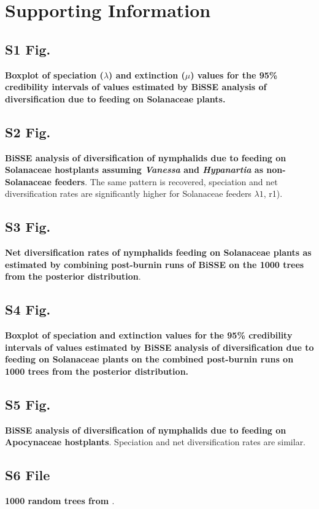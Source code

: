 \documentclass[10pt,letterpaper]{article}
\begin{document}
\section*{Supporting Information}

\subsection*{S1 Fig.}
\label{S1_Figure}
{\bf Boxplot of speciation (\(\lambda\)) and extinction
(\(\mu\)) values for the 95\% credibility intervals of values estimated
by BiSSE analysis of diversification due to feeding on Solanaceae
plants.}

\subsection*{S2 Fig.}
\label{S2_Figure}
{\bf BiSSE analysis of diversification of nymphalids
due to feeding on Solanaceae hostplants assuming \emph{Vanessa} and
\emph{Hypanartia} as non-Solanaceae feeders}. The same pattern is
recovered, speciation and net diversification rates are significantly
higher for Solanaceae feeders \(\lambda1\), r1).

\subsection*{S3 Fig.}
\label{S3_Figure}
{\bf Net diversification rates of nymphalids feeding on
Solanaceae plants as estimated by combining post-burnin runs of BiSSE on
the 1000 trees from the posterior distribution}.

\subsection*{S4 Fig.}
\label{S4_Figure}
{\bf Boxplot of speciation and extinction values for
the 95\% credibility intervals of values estimated by BiSSE analysis of
diversification due to feeding on Solanaceae plants on the combined
post-burnin runs on 1000 trees from the posterior distribution.}

\subsection*{S5 Fig.}
\label{S5_Figure}
{\bf BiSSE analysis of diversification of nymphalids
due to feeding on Apocynaceae hostplants}. Speciation and net
diversification rates are similar.

\subsection*{S6 File}
\label{S6_File}
{\bf 1000 random trees from \cite{wahlberg2009}}.
\end{document}
